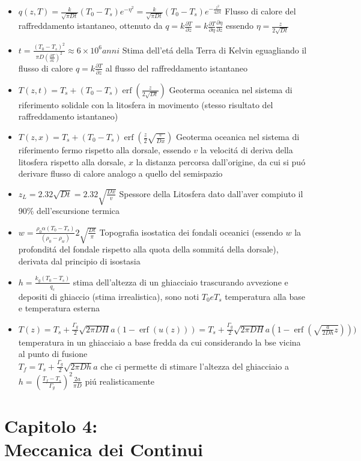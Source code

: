 \documentclass[a4paper]{article}
\DeclareMathOperator \erf{erf} %
\begin{document}
\begin{itemize}
	\item $q(z,T) = \frac{k}{\sqrt{\pi Dt}} (T_0-T_s) e^{-\eta^2} = \frac{k}{\sqrt{\pi Dt}} (T_0-T_s) e^{-\frac{z^2}{4Dt}}$ Flusso di calore del raffreddamento istantaneo, ottenuto da $q=k \frac{\partial T}{\partial z}= k\frac{\partial T}{\partial \eta} \frac{\partial \eta}{\partial z}$ essendo $\eta = \frac{z}{2 \sqrt{Dt}}$
	\item $t= \frac{(T_0-T_s)^2}{\pi D (\frac{\partial T}{\partial z})^2} \approx 6 \times 10^6 anni$ Stima dell'et\'a della Terra di Kelvin eguagliando il flusso di calore $q=k\frac{\partial T}{\partial z}$ al flusso del raffreddamento istantaneo
	\item $T(z,t) = T_s + (T_0 - T_s) \erf(\frac{z}{2 \sqrt{Dt}})$ Geoterma oceanica nel sistema di riferimento solidale con la litosfera in movimento (stesso risultato del raffreddamento istantaneo)
	\item $T(z,x) = T_s + (T_0 - T_s) \erf(\frac{z}{2} \sqrt{\frac{v}{Dx}})$ Geoterma oceanica nel sistema di riferimento fermo rispetto alla dorsale, essendo $v$ la velocit\'a di deriva della litosfera rispetto alla dorsale, $x$ la distanza percorsa dall'origine, da cui si pu\'o derivare flusso di calore analogo a quello del semispazio
	\item $z_L=2.32 \sqrt{Dt}=2.32 \sqrt{\frac{Dx}{v}}$ Spessore della Litosfera dato dall'aver compiuto il 90\% dell'escursione termica
	\item $ w = \frac{\rho_0 \alpha (T_0-T_s)}{(\rho_0-\rho_w)} 2 \sqrt{\frac{Dt}{\pi}}  $ Topografia isostatica dei fondali oceanici (essendo $w$ la profondit\'a del fondale rispetto alla quota della sommit\'a della dorsale), derivata dal principio di isostasia
	\item $h=\frac{k_g(T_0-T_s)}{q_c}$ stima dell'altezza di un ghiacciaio trascurando avvezione e depositi di ghiaccio (stima irrealistica), sono noti $T_0 e T_s$ temperatura alla base e temperatura esterna
	\item $T(z)=T_s+\frac{\Gamma_g}{2} \sqrt{2 \pi D H}{a}(1-\erf(u(z))) =T_s+\frac{\Gamma_g}{2} \sqrt{2 \pi D H}{a}(1-\erf(\sqrt{\frac{a}{2Dh}z})))$ temperatura in un ghiacciaio a base fredda da cui considerando la bse vicina al punto di fusione\\ $T_f=T_s+\frac{\Gamma_g}{2}\sqrt{2 \pi D h}{a}$ che ci permette di stimare l'altezza del ghiacciaio a $h=(\frac{T_f-T_s}{\Gamma_g})^2\frac{2a}{\pi D}$ pi\'u realisticamente
\end{itemize}

\section{Capitolo 4:\\ Meccanica dei Continui}
\end{document}
